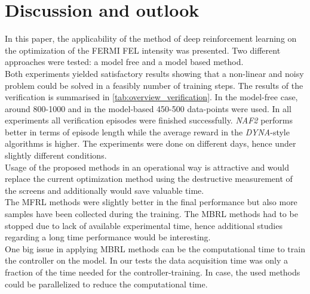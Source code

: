 \documentclass[
reprint,
amsmath,amssymb,amsfonts,clevref,
aps,
prstab,
]{revtex4-2}
\begin{document}
	\section{Discussion and outlook}
	In this paper, the applicability of the method of deep reinforcement learning on the optimization of the FERMI FEL intensity was presented. Two different approaches were tested: a model free and a model based method.\\
	 Both experiments yielded satisfactory results showing that a non-linear and noisy problem could be solved in a feasibly number of training steps. The results of the verification is summarised in \cref{tab:overview_verification}. In the model-free case, around 800-1000 and in the model-based 450-500 data-points were used. In all experiments all verification episodes were finished successfully. \emph{NAF2} performs better in terms of episode length while the average reward in the \emph{DYNA}-style algorithms is higher. The experiments were done on different days, hence under slightly different conditions.\\
	Usage of the proposed methods in an operational way is attractive and would replace the current optimization method using the destructive measurement of the screens and additionally would save valuable time.\\ 
	The MFRL methods were slightly better in the final performance but also more samples have been collected during the training. The MBRL methods had to be stopped due to lack of available experimental time, hence additional studies regarding a long time performance would be interesting.\\ One big issue in applying MBRL methods can be the computational time to train the controller on the model. In our tests the data acquisition time was only a fraction of the time needed for the controller-training. In case, the used methods could be parallelized to reduce the computational time.
\end{document}
